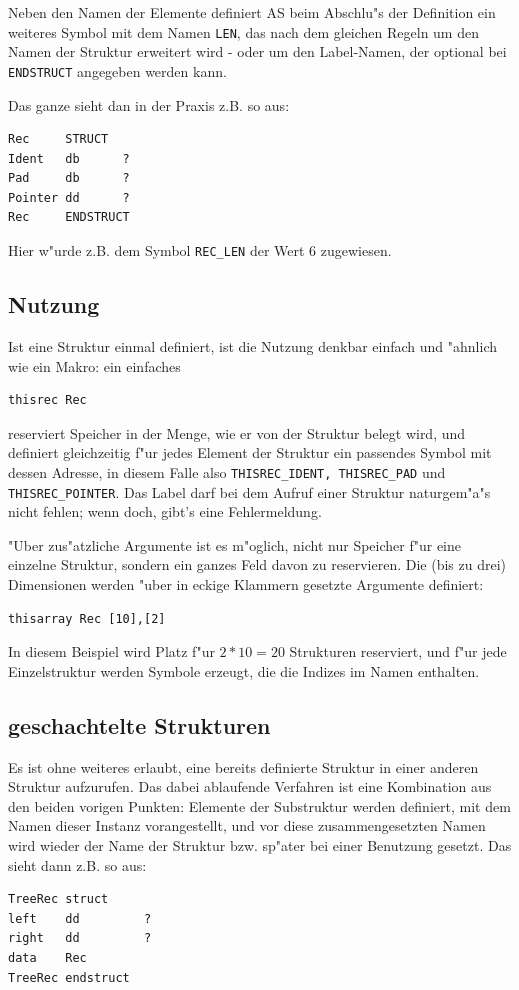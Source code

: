 \documentclass[12pt,a4paper,twoside]{report}
\newcommand{\tty}[1]{{\tt #1}}
\newcommand{\asname}{AS}
\begin{document}
Neben den Namen der Elemente definiert \asname{} beim Abschlu"s der Definition
ein weiteres Symbol mit dem Namen {\tt LEN}, das nach dem gleichen Regeln
um den Namen der Struktur erweitert wird - oder um den Label-Namen, der
optional bei \tty{ENDSTRUCT} angegeben werden kann.

Das ganze sieht dan in der Praxis z.B. so aus:
\begin{verbatim}
Rec     STRUCT
Ident   db      ?
Pad     db      ?
Pointer dd      ?
Rec     ENDSTRUCT
\end{verbatim}
Hier w"urde z.B. dem Symbol {\tt REC\_LEN} der Wert 6 zugewiesen.

\subsection{Nutzung}

Ist eine Struktur einmal definiert, ist die Nutzung denkbar einfach und
"ahnlich wie ein Makro: ein einfaches
\begin{verbatim}
thisrec Rec
\end{verbatim}
reserviert Speicher in der Menge, wie er von der Struktur belegt wird, und
definiert gleichzeitig f"ur jedes Element der Struktur ein passendes
Symbol mit dessen Adresse, in diesem Falle also {\tt THISREC\_IDENT,
THISREC\_PAD} und {\tt THISREC\_POINTER}.  Das Label darf bei dem Aufruf
einer Struktur naturgem"a"s nicht fehlen; wenn doch, gibt's eine
Fehlermeldung.

"Uber zus"atzliche Argumente ist es m"oglich, nicht nur Speicher f"ur eine
einzelne Struktur, sondern ein ganzes Feld davon zu reservieren.  Die (bis zu
drei) Dimensionen werden "uber in eckige Klammern gesetzte Argumente definiert:
\begin{verbatim}
thisarray Rec [10],[2]
\end{verbatim}
In diesem Beispiel wird Platz f"ur $2*10=20$ Strukturen reserviert, und f"ur
jede Einzelstruktur werden Symbole erzeugt, die die Indizes im Namen enthalten.

\subsection{geschachtelte Strukturen}

Es ist ohne weiteres erlaubt, eine bereits definierte Struktur in einer
anderen Struktur aufzurufen.  Das dabei ablaufende Verfahren ist eine
Kombination aus den beiden vorigen Punkten: Elemente der Substruktur
werden definiert, mit dem Namen dieser Instanz vorangestellt, und vor
diese zusammengesetzten Namen wird wieder der Name der Struktur bzw.
sp"ater bei einer Benutzung gesetzt.  Das sieht dann z.B. so aus:
\begin{verbatim}
TreeRec struct
left    dd         ?
right   dd         ?
data    Rec
TreeRec endstruct
\end{verbatim}
\end{document}
